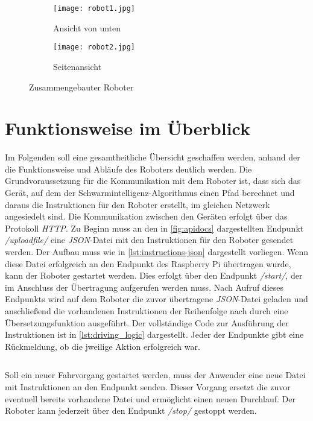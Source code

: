 \begin{figure}[H]
  \centering
  \begin{subfigure}[b]{0.45\textwidth}
    \texttt{[image: robot1.jpg]}
    \caption{Ansicht von unten}
  \end{subfigure}
  \hspace{1cm}
  \begin{subfigure}[b]{0.45\textwidth}
    \texttt{[image: robot2.jpg]}
    \caption{Seitenansicht}
  \end{subfigure}
  \caption{Zusammengebauter Roboter \label{fig:fertiger-roboter}}
\end{figure}

\section{Funktionsweise im Überblick}
Im Folgenden soll eine gesamtheitliche Übersicht geschaffen werden, anhand der die Funktionsweise und Abläufe des Roboters deutlich werden. Die Grundvoraussetzung für die Kommunikation mit dem Roboter ist, dass sich das Gerät, auf dem der Schwarmintelligenz-Algorithmus einen Pfad berechnet und daraus die Instruktionen für den Roboter erstellt, im gleichen Netzwerk angesiedelt sind. Die Kommunikation zwischen den Geräten erfolgt über das Protokoll \textit{HTTP}. Zu Beginn muss an den in \autoref{fig:apidocs} dargestellten Endpunkt \textit{/uploadfile/} eine \textit{JSON}-Datei mit den Instruktionen für den Roboter gesendet werden. Der Aufbau muss wie in \autoref{lst:instructions-json} dargestellt vorliegen. Wenn diese Datei erfolgreich an den Endpunkt des Raspberry Pi übertragen wurde, kann der Roboter gestartet werden. Dies erfolgt über den Endpunkt \textit{/start/}, der im Anschluss der Übertragung aufgerufen werden muss. Nach Aufruf dieses Endpunkts wird auf dem Roboter die zuvor übertragene \textit{JSON}-Datei geladen und anschließend die vorhandenen Instruktionen der Reihenfolge nach durch eine Übersetzungsfunktion ausgeführt. Der vollständige Code zur Ausführung der Instruktionen ist in \autoref{lst:driving_logic} dargestellt. Jeder der Endpunkte gibt eine Rückmeldung, ob die jweilige Aktion erfolgreich war. 

\inputminted{json}{{assets/code/instructions.json}}
\vspace*{-3mm}
\label{lst:instructions-json}
\vspace*{3mm}

Soll ein neuer Fahrvorgang gestartet werden, muss der Anwender eine neue Datei mit Instruktionen an den Endpunkt senden. Dieser Vorgang ersetzt die zuvor eventuell bereits vorhandene Datei und ermöglicht einen neuen Durchlauf. Der Roboter kann jederzeit über den Endpunkt \textit{/stop/} gestoppt werden.

